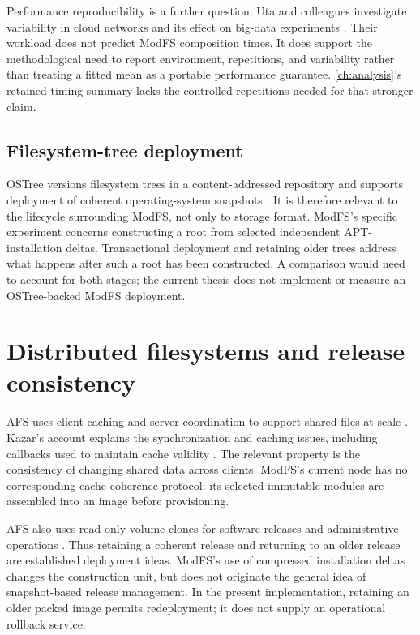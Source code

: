 Performance reproducibility is a further question. Uta and colleagues investigate variability in cloud networks and its effect on big-data experiments \autocite{uta2020reproducible}. Their workload does not predict ModFS composition times. It does support the methodological need to report environment, repetitions, and variability rather than treating a fitted mean as a portable performance guarantee. \cref{ch:analysis}'s retained timing summary lacks the controlled repetitions needed for that stronger claim.

\subsection{Filesystem-tree deployment}

OSTree versions filesystem trees in a content-addressed repository and supports deployment of coherent operating-system snapshots \autocite{ostree}. It is therefore relevant to the lifecycle surrounding ModFS, not only to storage format. ModFS's specific experiment concerns constructing a root from selected independent \ac{APT}-installation deltas. Transactional deployment and retaining older trees address what happens after such a root has been constructed. A comparison would need to account for both stages; the current thesis does not implement or measure an OSTree-backed ModFS deployment.

\section{Distributed filesystems and release consistency}

\ac{AFS} uses client caching and server coordination to support shared files at scale \autocite{howard1988afs,howard1988scale}. Kazar's account explains the synchronization and caching issues, including callbacks used to maintain cache validity \autocite{kazar1988synchronization}. The relevant property is the consistency of changing shared data across clients. ModFS's current node has no corresponding cache-coherence protocol: its selected immutable modules are assembled into an image before provisioning.

\ac{AFS} also uses read-only volume clones for software releases and administrative operations \autocite{howard1988afs}. Thus retaining a coherent release and returning to an older release are established deployment ideas. ModFS's use of compressed installation deltas changes the construction unit, but does not originate the general idea of snapshot-based release management. In the present implementation, retaining an older packed image permits redeployment; it does not supply an operational rollback service.

